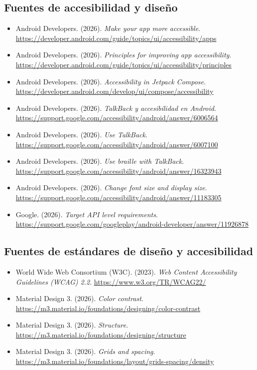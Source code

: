 \documentclass[11pt,a4paper]{article}
\begin{document}
	\subsection*{Fuentes de accesibilidad y diseño}
	{\small
		\begin{itemize}[leftmargin=*,itemsep=0.1em,label={}]
			\item Android Developers. (2026). \emph{Make your app more accessible}. \url{https://developer.android.com/guide/topics/ui/accessibility/apps}
			\item Android Developers. (2026). \emph{Principles for improving app accessibility}. \url{https://developer.android.com/guide/topics/ui/accessibility/principles}
			\item Android Developers. (2026). \emph{Accessibility in Jetpack Compose}. \url{https://developer.android.com/develop/ui/compose/accessibility}
			\item Android Developers. (2026). \emph{TalkBack y accesibilidad en Android}. \url{https://support.google.com/accessibility/android/answer/6006564}
			\item Android Developers. (2026). \emph{Use TalkBack}. \url{https://support.google.com/accessibility/android/answer/6007100}
			\item Android Developers. (2026). \emph{Use braille with TalkBack}. \url{https://support.google.com/accessibility/android/answer/16323943}
			\item Android Developers. (2026). \emph{Change font size and display size}. \url{https://support.google.com/accessibility/android/answer/11183305}
			\item Google. (2026). \emph{Target API level requirements}. \url{https://support.google.com/googleplay/android-developer/answer/11926878}
		\end{itemize}
	}
	
	\subsection*{Fuentes de estándares de diseño y accesibilidad}
	{\small
		\begin{itemize}[leftmargin=*,itemsep=0.1em,label={}]
			\item World Wide Web Consortium (W3C). (2023). \emph{Web Content Accessibility Guidelines (WCAG) 2.2}. \url{https://www.w3.org/TR/WCAG22/}
			\item Material Design 3. (2026). \emph{Color contrast}. \url{https://m3.material.io/foundations/designing/color-contrast}
			\item Material Design 3. (2026). \emph{Structure}. \url{https://m3.material.io/foundations/designing/structure}
			\item Material Design 3. (2026). \emph{Grids and spacing}. \url{https://m3.material.io/foundations/layout/grids-spacing/density}
		\end{itemize}
	}
	
\end{document}
